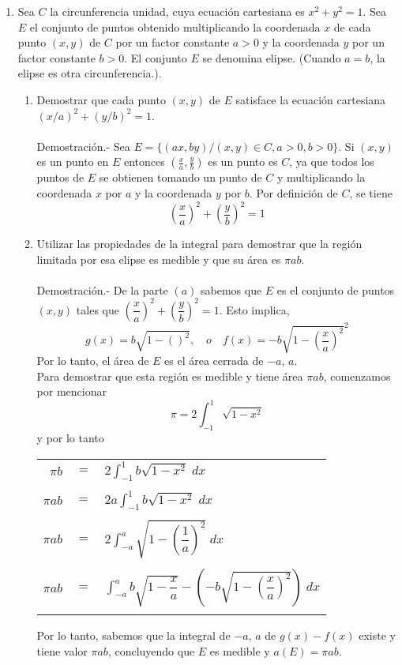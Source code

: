 \begin{enumerate}[\bfseries 1.]
\item Sea $C$ la circunferencia unidad, cuya ecuación cartesiana es $x^2+y^2 = 1$. Sea $E$ el conjunto de puntos obtenido multiplicando la coordenada $x$ de cada punto $(x,y)$ de $C$ por un factor constante $a>0$ y la coordenada $y$ por un factor constante $b>0$. El conjunto $E$ se denomina elipse. (Cuando $a=b$, la elipse es otra circunferencia.).


\begin{enumerate}[\bfseries a)]

    \item Demostrar que cada punto $(x,y)$ de $E$ satisface la ecuación cartesiana $(x/a)^2+(y/b)^2 = 1$.\\\\
	Demostración.-\; Sea $E=\lbrace (ax,by) / (x,y) \in C, a>0,b>0 \rbrace$. Si $(x,y)$ es un punto en $E$ entonces $\left(\frac{x}{a},\frac{y}{b}\right)$ es un punto es $C$, ya que todos los puntos de $E$ se obtienen tomando un punto de $C$ y multiplicando la coordenada $x$ por $a$ y la coordenada $y$ por $b$. Por definición de $C$, se tiene $$\left(\dfrac{x}{a}\right)^2+\left(\dfrac{y}{b}\right)^2 = 1$$

    \item Utilizar las propiedades de la integral para demostrar que la región limitada por esa elipse es medible y que su área es $\pi ab$.\\\\
	Demostración.-\; De la parte $(a)$ sabemos que $E$ es el conjunto de puntos $(x,y)$ tales que $\left(\dfrac{x}{a}\right)^2 + \left(\dfrac{y}{b}\right)^2 = 1$. Esto implica, $$g(x)=b\sqrt{1-\left(\right)^2}, \quad o \quad f(x)=-b\sqrt{1-\left(\dfrac{x}{a}\right)^2}^2$$
	Por lo tanto, el área de $E$ es el área cerrada de $-a$, $a$.\\
	Para demostrar que esta región es medible y tiene área $\pi ab$, comenzamos por mencionar $$\pi = 2\int_{-1}^1 \sqrt{1-x^2}$$ 
	y por lo tanto 
	\begin{center}
	    \begin{tabular}{rcl}
		$\pi b$ & $=$ & $2\displaystyle\int_{-1}^1 b\sqrt{1-x^2}\; dx$\\\\
		$\pi ab$ & $=$ & $2a\displaystyle\int_{-1}^1 b\sqrt{1-x^2}\; dx$\\\\
		$\pi ab$ & $=$ & $2\displaystyle\int_{-a}^a \sqrt{1 - \left(\dfrac{1}{a}\right)^2} \; dx$\\\\
		$\pi ab$ & $=$ & $\displaystyle\int_{-a}^a b\sqrt{1 - \dfrac{x}{a}} - \left(-b\sqrt{1-\left(\dfrac{x}{a}\right)^2}\right) \; dx$\\\\
	    \end{tabular}
	\end{center}
	Por lo tanto, sabemos que la integral de $-a$, $a$ de $g(x)-f(x)$ existe y tiene valor $\pi ab$, concluyendo que $E$ es medible y $a(E)=\pi ab$.\\\\


\end{enumerate}
\end{enumerate}
